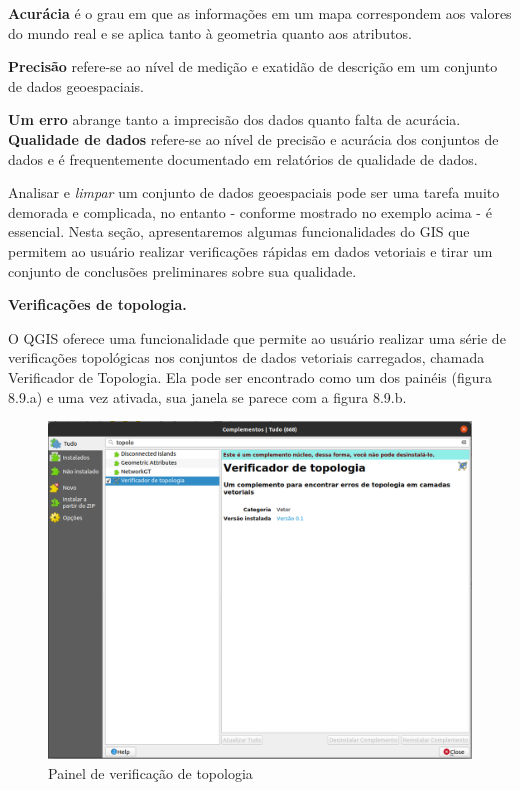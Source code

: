 \documentclass[
]{book}
\begin{document}
\textbf{Acurácia} é o grau em que as informações em um mapa correspondem aos valores do mundo real e se aplica tanto à geometria quanto aos atributos.

\textbf{Precisão} refere-se ao nível de medição e exatidão de descrição em um conjunto de dados geoespaciais.

\textbf{Um erro} abrange tanto a imprecisão dos dados quanto falta de acurácia. \textbf{Qualidade de dados} refere-se ao nível de precisão e acurácia dos conjuntos de dados e é frequentemente documentado em relatórios de qualidade de dados.

Analisar e \emph{limpar} um conjunto de dados geoespaciais pode ser uma tarefa muito demorada e complicada, no entanto - conforme mostrado no exemplo acima - é essencial. Nesta seção, apresentaremos algumas funcionalidades do GIS que permitem ao usuário realizar verificações rápidas em dados vetoriais e tirar um conjunto de conclusões preliminares sobre sua qualidade.

\textbf{Verificações de topologia.}

O QGIS oferece uma funcionalidade que permite ao usuário realizar uma série de verificações topológicas nos conjuntos de dados vetoriais carregados, chamada Verificador de Topologia. Ela pode ser encontrado como um dos painéis (figura 8.9.a) e uma vez ativada, sua janela se parece com a figura 8.9.b.

\begin{figure}
\centering
\includegraphics{media/modulo8/fig89_a.png}
\caption{Painel de verificação de topologia}
\end{figure}
\end{document}
